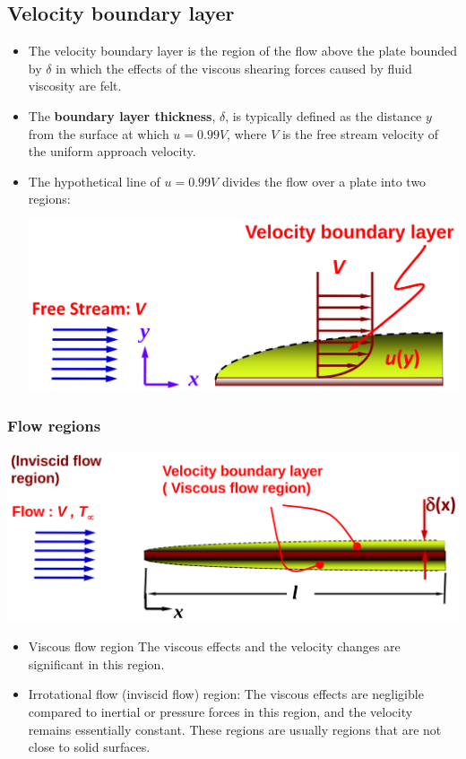 \documentclass[11pt]{article}
\begin{document}
\subsection{Velocity boundary layer}
\label{sec:org319431c}
\begin{itemize}
\item The velocity boundary layer is the region of the flow above the plate bounded by \(\delta\) in which the effects of the viscous shearing forces caused by fluid viscosity are felt.
\item The \textbf{boundary layer thickness}, \(\delta\), is typically defined as the distance \(y\) from the surface at which \(u = 0.99V\), where \(V\) is the free stream velocity of the uniform approach velocity.
\item The hypothetical line of \(u = 0.99V\) divides the flow over a plate into two regions:
\begin{center}
\includegraphics[width=.9\linewidth]{./images/velocity-boundary-layer-diagram.png}
\end{center}
\end{itemize}

\subsubsection{Flow regions}
\label{sec:org6701004}
\begin{center}
\includegraphics[width=.9\linewidth]{./images/velocity-boundary-layer-flow-regions-diagram.png}
\end{center}
\begin{itemize}
\item Viscous flow region
The viscous effects and the velocity changes are significant in this region.

\item Irrotational flow (inviscid flow) region:
The viscous effects are negligible compared to inertial or pressure forces in this region, and the velocity remains essentially constant. These regions are usually regions that are not close to solid surfaces.
\end{itemize}
\end{document}
